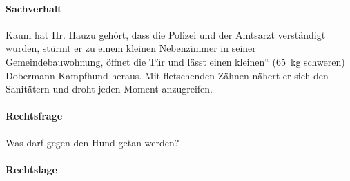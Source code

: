\paragraph{Sachverhalt}

Kaum hat Hr. Hauzu geh\"ort, dass die Polizei und der Amtsarzt
verständigt wurden, st\"urmt er zu einem kleinen Nebenzimmer in
seiner Gemeindebauwohnung, \"offnet die T\"ur und lässt einen
{\quotedblbase}kleinen{\textquotedblleft} (65~kg schweren)
Dobermann-Kampfhund heraus. Mit fletschenden Zähnen nähert er sich
den Sanitätern und droht jeden Moment anzugreifen.

\paragraph{Rechtsfrage}
Was darf gegen den Hund getan werden?

\paragraph{Rechtslage}

